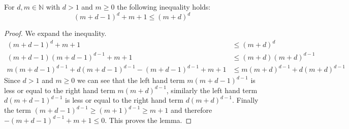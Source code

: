 \begin{lemma}
	\label{lem_md_ineq}
	For $d,m \in \mathbb{N}$ with $d>1$ and $m \geq 0$ the following inequality holds:
	\[ (m+d-1)^d + m+1 \leq (m+d)^d \]
	\begin{proof}
		We expand the inequality.
		\begin{align*}
		(m+d-1)^d + m + 1 & \leq (m+d)^d\\
		(m+d-1)(m+d-1)^{d-1} + m + 1 & \leq (m+d)(m+d)^{d-1}\\
		m(m+d-1)^{d-1} + d(m+d-1)^{d-1} - (m+d-1)^{d-1} + m + 1 & \leq m(m+d)^{d-1} + d(m+d)^{d-1}
		\end{align*}
		Since $d > 1$ and $m \geq 0$ we can see that the left hand term $m(m+d-1)^{d-1}$ is less or equal to the right hand term $m(m+d)^{d-1}$, similarly the left hand term $d(m+d-1)^{d-1}$ is less or equal to the right hand term $d(m+d)^{d-1}$. Finally the term $(m+d-1)^{d-1} \geq (m+1)^{d-1} \geq m+1$ and therefore $- (m+d-1)^{d-1} + m + 1  \leq 0$. This proves the lemma.
	\end{proof}
\end{lemma}
